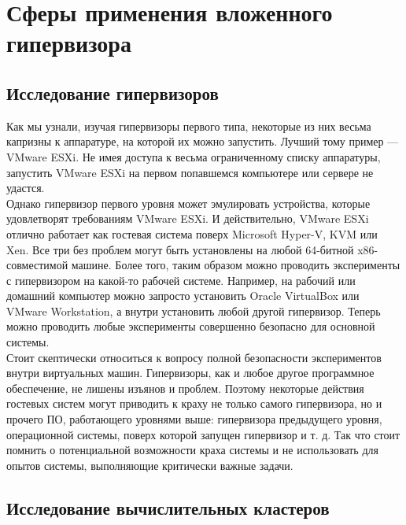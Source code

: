 \documentclass[14pt, a4paper]{article}
\begin{document}
\section*{Сферы применения вложенного гипервизора}

\subsection*{Исследование гипервизоров}

Как мы узнали, изучая гипервизоры первого типа, некоторые из них весьма капризны к аппаратуре, на
которой их можно запустить. Лучший тому пример — VMware ESXi. Не имея доступа к весьма
ограниченному списку аппаратуры, запустить VMware ESXi на первом попавшемся компьютере или
сервере не удастся.\\

Однако гипервизор первого уровня может эмулировать устройства, которые удовлетворят
требованиям VMware ESXi. И действительно, VMware ESXi отлично работает как гостевая система
поверх Microsoft Hyper-V, KVM или Xen. Все три без проблем могут быть установлены на любой
64-битной x86-совместимой машине. Более того, таким образом можно проводить эксперименты с
гипервизором на какой-то рабочей системе. Например, на рабочий или домашний компьютер можно
запросто установить Oracle VirtualBox или VMware Workstation, а внутри установить любой другой
гипервизор. Теперь можно проводить любые эксперименты совершенно безопасно для основной
системы.\\

Стоит скептически относиться к вопросу полной безопасности экспериментов внутри виртуальных
машин. Гипервизоры, как и любое другое программное обеспечение, не лишены изъянов и проблем.
Поэтому некоторые действия гостевых систем могут приводить к краху не только самого гипервизора,
но и прочего ПО, работающего уровнями выше: гипервизора предыдущего уровня, операционной
системы, поверх которой запущен гипервизор и т. д. Так что стоит помнить о потенциальной
возможности краха системы и не использовать для опытов системы, выполняющие критически
важные задачи.

\subsection*{Исследование вычислительных кластеров}
\end{document}
